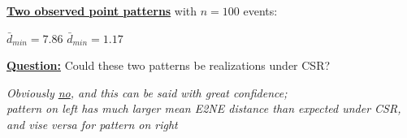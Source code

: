 \documentclass[portrait]{seminar}
\begin{document}
%
%
\begin{slide*}
\begin{center}
 \vspace*{-0.7cm} 
\end{center}
 \vspace{0.1cm}

\underline{\textbf{Two observed point patterns}} with $n=100$
events:

\vspace{0.0cm}
\begin{center}
\begin{figure}
\hspace{0.5cm} 
\end{figure}
\end{center}
\vspace{-0.4cm} {\small \hspace{1.6cm} $\bar{d}_{min} = 7.86$
\hspace{2.2cm} $\bar{d}_{min} = 1.17$}

\vspace{0.1cm}\underline{\textbf{Question:}} Could these two
patterns be realizations under CSR?

\vspace{-0.2cm}
\begin{center}
\begin{figure}
\end{figure}
\end{center}

\vspace{-0.3cm}
\begin{center}
\emph{Obviously \underline{no}, and this can be said with great
confidence; \\ {\small pattern on left has much larger mean E2NE
distance than expected under CSR, and vise versa for pattern on
right}}
\end{center}

\end{slide*}
\end{document}
